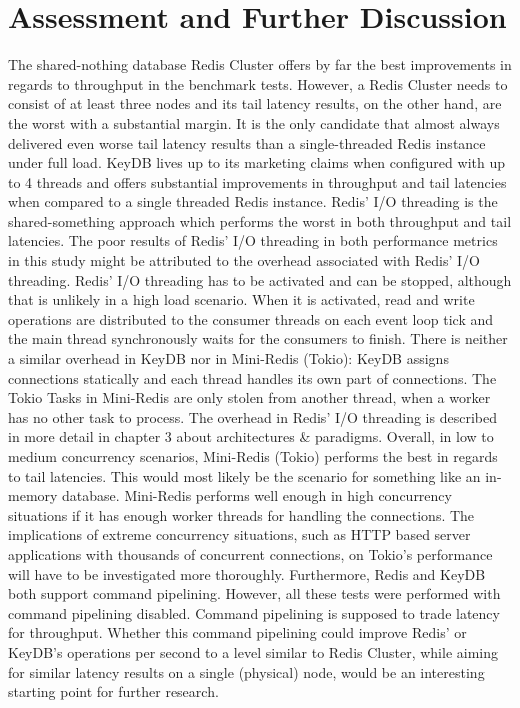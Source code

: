\section{Assessment and Further Discussion}
The shared-nothing database Redis Cluster offers by far the best improvements in regards to throughput in the benchmark tests. However, a Redis Cluster needs to consist of at least three nodes and its tail latency results, on the other hand, are the worst with a substantial margin. It is the only candidate that almost always delivered even worse tail latency results than a single-threaded Redis instance under full load. \newline 
KeyDB lives up to its marketing claims when configured with up to 4 threads and offers substantial improvements in throughput and tail latencies when compared to a single threaded Redis instance. \newline 
Redis’ I/O threading is the shared-something approach which performs the worst in both throughput and tail latencies. \newline 
The poor results of Redis’ I/O threading in both performance metrics in this study might be attributed to the overhead associated with Redis’ I/O threading. Redis’ I/O threading has to be activated and can be stopped, although that is unlikely in a high load scenario. When it is activated, read and write operations are distributed to the consumer threads on each event loop tick and the main thread synchronously waits for the consumers to finish. There is neither a similar overhead in KeyDB nor in Mini-Redis (Tokio): \newline KeyDB assigns connections statically and each thread handles its own part of connections. The Tokio Tasks in Mini-Redis are only stolen from another thread, when a worker has no other task to process. The overhead in Redis’ I/O threading is described in more detail in chapter 3 about architectures \& paradigms. \newline 
Overall, in low to medium concurrency scenarios, Mini-Redis (Tokio) performs the best in regards to tail latencies. This would most likely be the scenario for something like an in-memory database. Mini-Redis performs well enough in high concurrency situations if it has enough worker threads for handling the connections. The implications of extreme concurrency situations, such as HTTP based server applications with thousands of concurrent connections, on Tokio’s performance will have to be investigated more thoroughly. \newline 
Furthermore, Redis and KeyDB both support command pipelining. However, all these tests were performed with command pipelining disabled. Command pipelining is supposed to trade latency for throughput. Whether this command pipelining could improve Redis’ or KeyDB’s operations per second to a level similar to Redis Cluster, while aiming for similar latency results on a single (physical) node, would be an interesting starting point for further research.


%
%
%
%
%